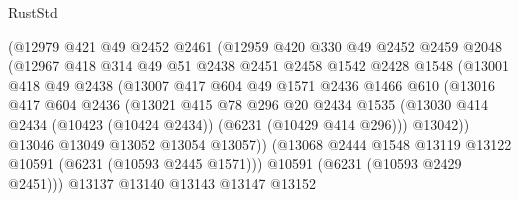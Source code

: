 \begin{lexlean}{RustStd}
\begin{coremodule}
{{                        (@12979
                          @421
                          @49
                          @2452
                          @2461
                          (@12959
                            @420
                            @330
                            @49
                            @2452
                            @2459
                            @2048
                            (@12967
                              @418
                              @314
                              @49
                              @51
                              @2438
                              @2451
                              @2458
                              @1542
                              @2428
                              @1548
                              (@13001
                                @418
                                @49
                                @2438
                                (@13007
                                  @417
                                  @604
                                  @49
                                  @1571
                                  @2436
                                  @1466
                                  @610
                                  (@13016
                                    @417
                                    @604
                                    @2436
                                    (@13021
                                      @415
                                      @78
                                      @296
                                      @20
                                      @2434
                                      @1535
                                      (@13030
                                        @414
                                        @2434
                                        (@10423 (@10424 @2434))
                                        (@6231 (@10429 @414 @296)))
                                      @13042))
                                  @13046
                                  @13049
                                  @13052
                                  @13054
                                  @13057))
                              (@13068 @2444 @1548 @13119 @13122 @10591 (@6231 (@10593 @2445 @1571)))
                              @10591
                              (@6231 (@10593 @2429 @2451)))
                            @13137
                            @13140
                            @13143
                            @13147
                            @13152
}}
\end{coremodule}
\end{lexlean}
